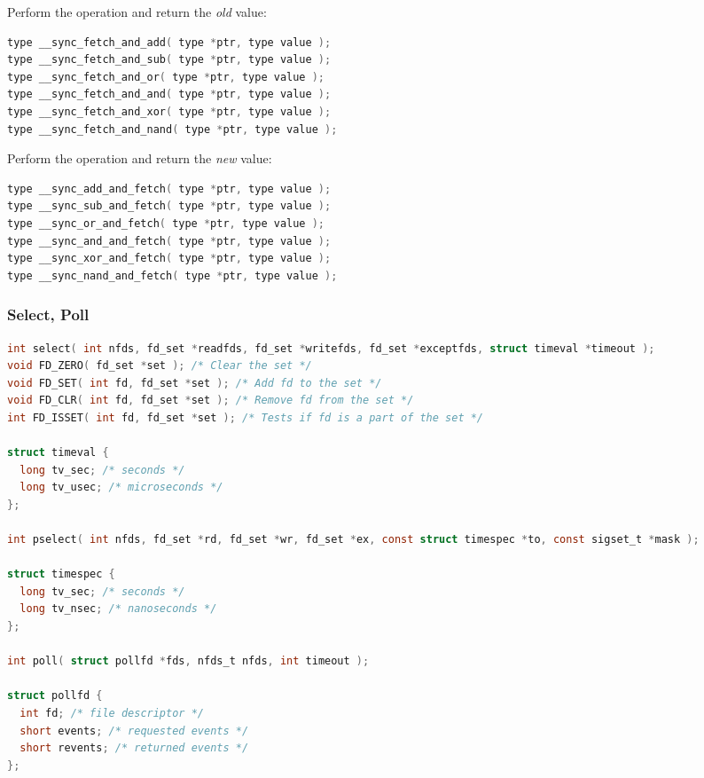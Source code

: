 \documentclass[legalpaper,10pt]{article}
\begin{document}
\vspace{-1em}

\begin{multicols}{2}
Perform the operation and return the \textit{old} value:
\begin{lstlisting}[language=C]
type __sync_fetch_and_add( type *ptr, type value );
type __sync_fetch_and_sub( type *ptr, type value );
type __sync_fetch_and_or( type *ptr, type value );
type __sync_fetch_and_and( type *ptr, type value );
type __sync_fetch_and_xor( type *ptr, type value );
type __sync_fetch_and_nand( type *ptr, type value );
\end{lstlisting}

\columnbreak

Perform the operation and return the \textit{new} value:
\begin{lstlisting}[language=C]
type __sync_add_and_fetch( type *ptr, type value );
type __sync_sub_and_fetch( type *ptr, type value );
type __sync_or_and_fetch( type *ptr, type value );
type __sync_and_and_fetch( type *ptr, type value );
type __sync_xor_and_fetch( type *ptr, type value );
type __sync_nand_and_fetch( type *ptr, type value );
\end{lstlisting}
\end{multicols}

\newpage
\subsubsection*{Select, Poll}

\begin{lstlisting}[language=C]
int select( int nfds, fd_set *readfds, fd_set *writefds, fd_set *exceptfds, struct timeval *timeout );
void FD_ZERO( fd_set *set ); /* Clear the set */
void FD_SET( int fd, fd_set *set ); /* Add fd to the set */
void FD_CLR( int fd, fd_set *set ); /* Remove fd from the set */
int FD_ISSET( int fd, fd_set *set ); /* Tests if fd is a part of the set */

struct timeval {
  long tv_sec; /* seconds */
  long tv_usec; /* microseconds */ 
};

int pselect( int nfds, fd_set *rd, fd_set *wr, fd_set *ex, const struct timespec *to, const sigset_t *mask );

struct timespec {
  long tv_sec; /* seconds */
  long tv_nsec; /* nanoseconds */
};

int poll( struct pollfd *fds, nfds_t nfds, int timeout );

struct pollfd {
  int fd; /* file descriptor */ 
  short events; /* requested events */ 
  short revents; /* returned events */
};
\end{lstlisting}
\end{document}
